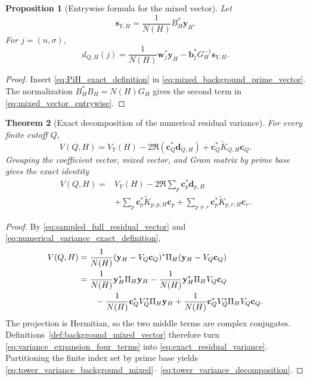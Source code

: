 \documentclass[11pt]{amsart}
\numberwithin{equation}{section}
\theoremstyle{plain}
\newtheorem{theorem}{Theorem}[section]
\newtheorem{proposition}[theorem]{Proposition}
\theoremstyle{definition}
\theoremstyle{remark}
\newcommand{\1}{\mathbf{1}}
\begin{document}
\begin{proposition}[Entrywise formula for the mixed vector]
\label{prop:mixed_vector_entrywise}
Let
\begin{equation}
\mathbf s_{Y,H}
=
\frac1{N(H)}B_H^\ast\mathbf y_H.
\label{eq:background_removed_coordinates}
\end{equation}
For $j=(n,\sigma)$,
\begin{equation}
\boxed{
 d_{Q,H}(j)
=
\frac1{N(H)}\mathbf w_j^\ast\mathbf y_H
-
\mathbf b_j^\ast G_H^{-1}\mathbf s_{Y,H}.
}
\label{eq:mixed_vector_entrywise}
\end{equation}
\end{proposition}

\begin{proof}
Insert \eqref{eq:PiH_exact_definition} in
\eqref{eq:mixed_background_prime_vector}.  The normalization
$B_H^\ast B_H=N(H)G_H$ gives the second term in
\eqref{eq:mixed_vector_entrywise}.
\end{proof}

\begin{theorem}[Exact decomposition of the numerical residual variance]
\label{thm:exact_system_variance}
For every finite cutoff $Q$,
\begin{equation}
\boxed{
V(Q,H)
=
V_Y(H)
-
2\Re\left(\mathbf c_Q^\ast\mathbf d_{Q,H}\right)
+
\mathbf c_Q^\ast\widetilde K_{Q,H}\mathbf c_Q.
}
\label{eq:exact_residual_variance}
\end{equation}
Grouping the coefficient vector, mixed vector, and Gram matrix by prime
base gives the exact identity
\begin{align}
V(Q,H)
={}&
V_Y(H)
-
2\Re\sum_p\mathbf c_p^\ast\mathbf d_{p,H}
\label{eq:tower_variance_background_mixed}
\\
&+
\sum_p
\mathbf c_p^\ast\widetilde K_{p,p;H}\mathbf c_p
+
\sum_{p\neq r}
\mathbf c_p^\ast\widetilde K_{p,r;H}\mathbf c_r.
\label{eq:tower_variance_decomposition}
\end{align}
\end{theorem}

\begin{proof}
By \eqref{eq:sampled_full_residual_vector} and
\eqref{eq:numerical_variance_exact_definition},
\begin{align}
V(Q,H)
&=
\frac1{N(H)}
(\mathbf y_H-V_Q\mathbf c_Q)^\ast
\Pi_H
(\mathbf y_H-V_Q\mathbf c_Q)
\label{eq:variance_expansion_start}
\\
&=
\frac1{N(H)}\mathbf y_H^\ast\Pi_H\mathbf y_H
-
\frac1{N(H)}\mathbf y_H^\ast\Pi_HV_Q\mathbf c_Q
\notag
\\
&\qquad
-
\frac1{N(H)}\mathbf c_Q^\ast V_Q^\ast\Pi_H\mathbf y_H
+
\frac1{N(H)}\mathbf c_Q^\ast V_Q^\ast\Pi_HV_Q\mathbf c_Q.
\label{eq:variance_expansion_four_terms}
\end{align}
The projection is Hermitian, so the two middle terms are complex
conjugates.  Definitions~\ref{def:background_mixed_vector} therefore turn
\eqref{eq:variance_expansion_four_terms} into
\eqref{eq:exact_residual_variance}.  Partitioning the finite index set by
prime base yields \eqref{eq:tower_variance_background_mixed}--
\eqref{eq:tower_variance_decomposition}.
\end{proof}
\end{document}
